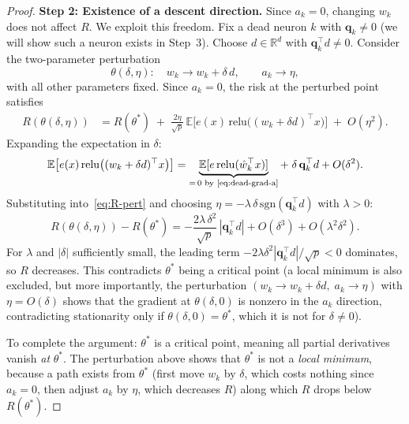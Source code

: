 \documentclass[11pt]{amsart}
\theoremstyle{definition}
\newcommand{\R}{\mathbb{R}}
\newcommand{\E}{\mathbb{E}}
\newcommand{\abs}[1]{| #1 |}
\newcommand{\relu}{\mathrm{relu}}
\newcommand{\sgn}{\mathrm{sgn}}
\begin{document}
\begin{proof}
\medskip
\noindent\textbf{Step 2: Existence of a descent direction.}
Since $a_k = 0$, changing $w_k$ does not affect $R$.  We exploit this freedom.
Fix a dead neuron $k$ with $\mathbf{q}_k \neq 0$ (we will show such a neuron
exists in Step~3).  Choose $d \in \R^d$ with
$\mathbf{q}_k^\top d \neq 0$.  Consider the two-parameter perturbation
\[
  \theta(\delta, \eta):\quad
  w_k \to w_k + \delta\,d, \qquad a_k \to \eta,
\]
with all other parameters fixed.  Since $a_k = 0$, the risk at the perturbed
point satisfies
\begin{align}
  R(\theta(\delta, \eta))
  &= R(\theta^*) \;+\;
     \frac{2\eta}{\sqrt{p}}\,
     \E\bigl[e(x)\,\relu\bigl((w_k + \delta d)^\top x\bigr)\bigr]
     \;+\; O(\eta^2). \label{eq:R-pert}
\end{align}
Expanding the expectation in $\delta$:
\[
  \E\bigl[e(x)\,\relu\bigl((w_k + \delta d)^\top x\bigr)\bigr]
  = \underbrace{\E[e\,\relu(\hat{w}_k^\top x)]}_{=\,0\text{ by \eqref{eq:dead-grad-a}}}
    + \;\delta\,\mathbf{q}_k^\top d
    + O(\delta^2).
\]
Substituting into~\eqref{eq:R-pert} and choosing
$\eta = -\lambda\,\delta\,\sgn(\mathbf{q}_k^\top d)$ with $\lambda > 0$:
\[
  R(\theta(\delta, \eta)) - R(\theta^*)
  = -\frac{2\lambda\,\delta^2}{\sqrt{p}}\,\abs{\mathbf{q}_k^\top d}
    + O(\delta^3) + O(\lambda^2 \delta^2).
\]
For $\lambda$ and $\abs{\delta}$ sufficiently small, the leading term
$-2\lambda\delta^2 \abs{\mathbf{q}_k^\top d}/\sqrt{p} < 0$ dominates,
so $R$ decreases.  This contradicts $\theta^*$ being a critical point
(a local minimum is also excluded, but more importantly, the perturbation
$(w_k \to w_k + \delta d,\; a_k \to \eta)$ with $\eta = O(\delta)$ shows
that the gradient at $\theta(\delta, 0)$ is nonzero in the $a_k$ direction,
contradicting stationarity only if $\theta(\delta,0) = \theta^*$, which
it is not for $\delta \neq 0$).

To complete the argument: $\theta^*$ is a critical point, meaning all partial
derivatives vanish \emph{at} $\theta^*$.  The perturbation above shows that
$\theta^*$ is not a \emph{local minimum}, because a path exists from
$\theta^*$ (first move $w_k$ by $\delta$, which costs nothing since $a_k=0$,
then adjust $a_k$ by $\eta$, which decreases $R$) along which $R$ drops below
$R(\theta^*)$.


\end{proof}
\end{document}
